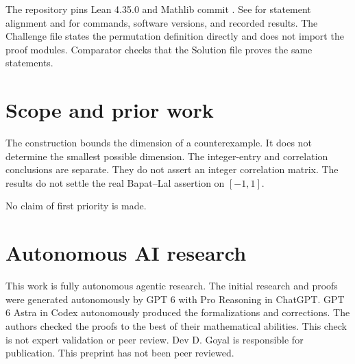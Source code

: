 \documentclass[11pt]{article}
\begin{document}
The repository pins Lean 4.35.0 and Mathlib commit
.
See  for statement alignment and
 for commands, software versions, and
recorded results. The Challenge file states the permutation definition
directly and does not import the proof modules. Comparator checks that the
Solution file proves the same statements.

\section{Scope and prior work}
The construction bounds the dimension of a counterexample. It does not
determine the smallest possible dimension. The integer-entry and correlation
conclusions are separate. They do not assert an integer correlation matrix. The results do not settle the
real Bapat--Lal assertion on $[-1,1]$.

No claim of first priority is made.

\section*{Autonomous AI research}
This work is fully autonomous agentic research. The initial research and proofs were generated autonomously by GPT 6 with Pro Reasoning in ChatGPT. GPT 6 Astra in Codex autonomously produced the formalizations and corrections. The authors checked the proofs to the best of their mathematical abilities. This check is not expert validation or peer review. Dev D. Goyal is responsible for publication. This preprint has not been peer reviewed.



\end{document}

